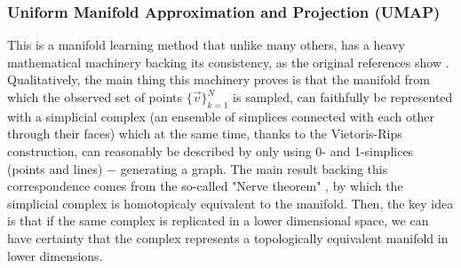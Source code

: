 \documentclass[11pt, a4paper, twoside]{article} %
\begin{document}
\subsubsection*{Uniform Manifold Approximation and Projection (UMAP)}\vspace{-0.15cm}
This is a manifold learning method that unlike many others, has a heavy mathematical machinery backing its consistency, as the original references show \cite{umap,umaplearn}. Qualitatively, the main thing this machinery proves is that the manifold from which the observed set of points $\{\vec{v}\}_{k=1}^N$ is sampled, can faithfully be represented with a simplicial complex (an ensemble of simplices connected with each other through their faces) which at the same time, thanks to the Vietoris-Rips construction, can reasonably be described by only using 0- and 1-simplices (points and lines) $-$ generating a graph. The main result backing this correspondence comes from the so-called "Nerve theorem" \cite{ umap}, by which the simplicial complex is homotopicaly equivalent to the manifold. Then, the key idea is that if the same complex is replicated in a lower dimensional space, we can have certainty that the complex represents a topologically equivalent manifold in lower dimensions. 
\end{document}

